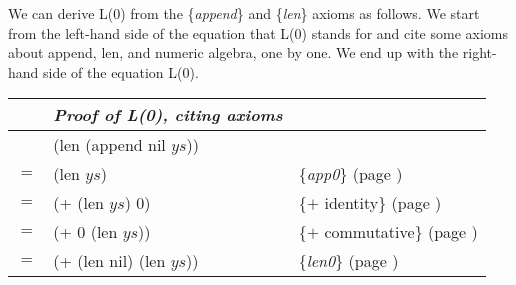 
We can derive L(0) from the \{\emph{append}\} and \{\emph{len}\} axioms as follows.
We start from the left-hand side of the equation that L(0) stands for and
cite some axioms about \textsf{append}, \textsf{len}, and numeric algebra,
one by one. We end up with the right-hand side of the equation L(0).
\begin{center}
\begin{tabular}{lll}
&\emph{Proof of L(0), citing axioms}&\\
\hline
    & \textsf{(len (append nil $ys$))}  &                                                \\
$=$ & \textsf{(len $ys$)}               & \{\emph{app0}\}     (page \pageref{append-equations})\\
$=$ & \textsf{(+ (len $ys$) 0)}         & \{$+$ identity\}    (page \pageref{fig-02-01}) \\
$=$ & \textsf{(+ 0 (len $ys$))}         & \{$+$ commutative\} (page \pageref{fig-02-01}) \\
$=$ & \textsf{(+ (len nil) (len $ys$))} & \{\emph{len0}\}     (page \pageref{len-equations})
\end{tabular}
\end{center}

